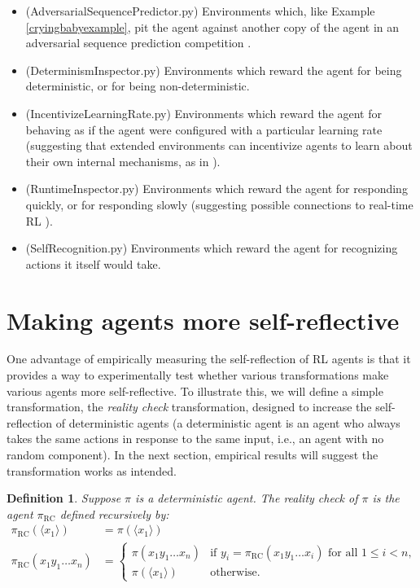 \documentclass{article}
\newtheorem{definition}[mytheorem]{Definition}
\def\RC{\textrm{RC}}
\begin{document}
\begin{itemize}
  \item
  (AdversarialSequencePredictor.py) Environments which, like Example \ref{cryingbabyexample}, pit the agent against
  another copy of the agent in an adversarial sequence prediction competition
  \cite{hibbard2008adversarial}.
  \item
  (DeterminismInspector.py) Environments which reward the agent for being deterministic,
  or for being non-deterministic.
  \item
  (IncentivizeLearningRate.py) Environments which reward the agent for behaving as if
  the agent were configured with a particular learning rate (suggesting that extended
  environments can incentivize agents to learn about their own internal mechanisms,
  as in \cite{sherstan2016introspective}).
  \item
  (RuntimeInspector.py) Environments which reward the agent for responding quickly,
  or for responding slowly (suggesting possible connections to real-time RL \cite{gavane}).
  \item
  (SelfRecognition.py) Environments which reward the agent for recognizing actions it itself
  would take.
\end{itemize}

\section{Making agents more self-reflective}
\label{realitychecksection}

One advantage of empirically measuring the self-reflection of RL agents is that it
provides a way to experimentally test whether various transformations make various
agents more self-reflective. To illustrate this, we will define a simple transformation,
the \emph{reality check} transformation, designed to increase the self-reflection
of deterministic agents (a deterministic agent is an agent who always takes the same
actions in response to the same input, i.e., an agent with no random component).
In the next section, empirical results will suggest the transformation works as intended.

\begin{definition}
\label{realitycheckdefn}
  Suppose $\pi$ is a deterministic agent. The \emph{reality check} of $\pi$ is the agent
  $\pi_{\RC}$ defined recursively by:
  \begin{align*}
    \pi_{\RC}(\langle x_1\rangle) &= \pi(\langle x_1\rangle)\\
    \pi_{\RC}(x_1y_1\ldots x_n) &=
    \begin{cases}
      \pi(x_1y_1\ldots x_n) & \mbox{if $y_i=\pi_{\RC}(x_1y_1\ldots x_i)$ for all $1\leq i<n$,}\\
      \pi(\langle x_1\rangle) & \mbox{otherwise.}
    \end{cases}
  \end{align*}
\end{definition}
\end{document}
